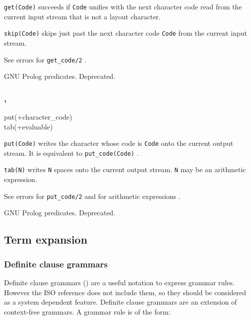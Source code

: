 \texttt{get(Code)} succeeds if \texttt{Code} unifies with the next character
code read from the current input stream that is not a layout character.

\texttt{skip(Code)} skips just past the next character code \texttt{Code}
from the current input stream.

\Errors

See errors for \texttt{get\_code/2} .

\Portability

GNU Prolog predicates. Deprecated.

\subsubsection{,
               }

\begin{TemplatesOneCol}
put(+character\_code)\\
tab(+evaluable)

\end{TemplatesOneCol}

\Description

\texttt{put(Code)} writes the character whose code is \texttt{Code} onto the
current output stream. It is equivalent to \texttt{put\_code(Code)}
.

\texttt{tab(N)} writes \texttt{N} spaces onto the current output
stream. \texttt{N} may be an arithmetic expression.

\Errors

See errors for \texttt{put\_code/2}  and for arithmetic
expressions .

\Portability

GNU Prolog predicates. Deprecated.

\subsection{Term expansion}
\label{Term-expansion}

\subsubsection{Definite clause grammars}
\label{DCG}

Definite clause grammars () are a useful notation to express grammar rules.
However the ISO reference does not include them, so they should be considered
as a system dependent feature. Definite clause grammars are an extension of
context-free grammars. A grammar rule is of the form:

